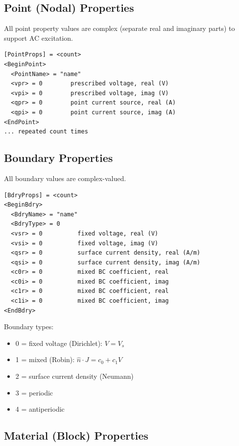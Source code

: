 \documentclass[11pt]{article}
\begin{document}
\subsection{Point (Nodal) Properties}

All point property values are complex (separate real and imaginary
parts) to support AC excitation.

\begin{lstlisting}
[PointProps] = <count>
<BeginPoint>
  <PointName> = "name"
  <vpr> = 0        prescribed voltage, real (V)
  <vpi> = 0        prescribed voltage, imag (V)
  <qpr> = 0        point current source, real (A)
  <qpi> = 0        point current source, imag (A)
<EndPoint>
... repeated count times
\end{lstlisting}

\subsection{Boundary Properties}

All boundary values are complex-valued.

\begin{lstlisting}
[BdryProps] = <count>
<BeginBdry>
  <BdryName> = "name"
  <BdryType> = 0
  <vsr> = 0          fixed voltage, real (V)
  <vsi> = 0          fixed voltage, imag (V)
  <qsr> = 0          surface current density, real (A/m)
  <qsi> = 0          surface current density, imag (A/m)
  <c0r> = 0          mixed BC coefficient, real
  <c0i> = 0          mixed BC coefficient, imag
  <c1r> = 0          mixed BC coefficient, real
  <c1i> = 0          mixed BC coefficient, imag
<EndBdry>
\end{lstlisting}

Boundary types:
\begin{itemize}[nosep]
  \item 0 = fixed voltage (Dirichlet): $V = V_s$
  \item 1 = mixed (Robin): $\hat{n} \cdot J = c_0 + c_1 V$
  \item 2 = surface current density (Neumann)
  \item 3 = periodic
  \item 4 = antiperiodic
\end{itemize}

\subsection{Material (Block) Properties}
\end{document}
